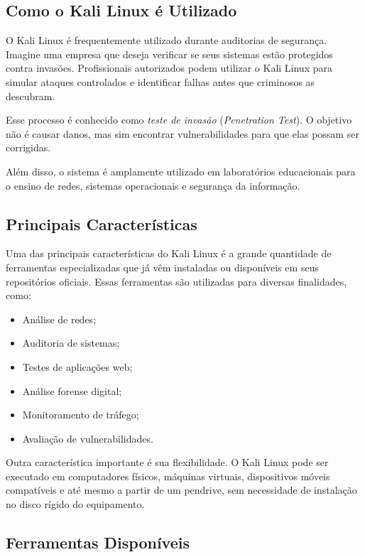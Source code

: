 \documentclass{article}
\begin{document}
\subsection{Como o Kali Linux é Utilizado}

O Kali Linux é frequentemente utilizado durante auditorias de segurança. Imagine uma empresa que deseja verificar se seus sistemas estão protegidos contra invasões. Profissionais autorizados podem utilizar o Kali Linux para simular ataques controlados e identificar falhas antes que criminosos as descubram.

Esse processo é conhecido como \textit{teste de invasão} (\textit{Penetration Test}). O objetivo não é causar danos, mas sim encontrar vulnerabilidades para que elas possam ser corrigidas.

Além disso, o sistema é amplamente utilizado em laboratórios educacionais para o ensino de redes, sistemas operacionais e segurança da informação.



\subsection{Principais Características}

Uma das principais características do Kali Linux é a grande quantidade de ferramentas especializadas que já vêm instaladas ou disponíveis em seus repositórios oficiais. Essas ferramentas são utilizadas para diversas finalidades, como:

\begin{itemize}
\item Análise de redes;
\item Auditoria de sistemas;
\item Testes de aplicações web;
\item Análise forense digital;
\item Monitoramento de tráfego;
\item Avaliação de vulnerabilidades.
\end{itemize}

Outra característica importante é sua flexibilidade. O Kali Linux pode ser executado em computadores físicos, máquinas virtuais, dispositivos móveis compatíveis e até mesmo a partir de um pendrive, sem necessidade de instalação no disco rígido do equipamento.

\subsection{Ferramentas Disponíveis}
\end{document}

